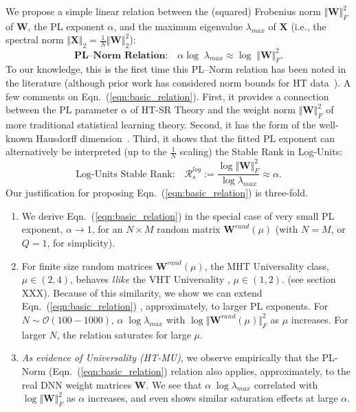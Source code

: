 We propose a simple linear relation between the (squared) Frobenius norm $\Vert\mathbf{W}\Vert^{2}_{F}$ of $\mathbf{W}$, the PL exponent $\alpha$, and the maximum eigenvalue $\lambda_{max}$ of $\mathbf{X}$ (i.e., the spectral norm $\Vert\mathbf{X}\Vert_{2}=\frac{1}{N}\Vert\mathbf{W}\Vert^{2}_{2}$):  
\begin{equation}
\textbf{PL--Norm Relation:} \quad \alpha\log\;\lambda_{max}\approx\log\;\Vert\mathbf{W}\Vert^{2}_{F}  .
\label{eqn:basic_relation}
\end{equation}
To our knowledge, this is the first time this PL--Norm relation has been noted in the literature (although prior work has considered norm bounds for HT data~\cite{MN09_TR}).
A few comments on Eqn.~(\ref{eqn:basic_relation}).
First, it provides a connection between the PL parameter $\alpha$ of HT-SR Theory and the weight norm $\Vert\mathbf{W}\Vert^{2}_{F}$ of more traditional statistical learning theory.
Second, it has the form of the well-known Hausdorff dimension~\cite{Sch07}.
Third, it shows that the fitted PL exponent can alternatively be interpreted (up to the $\frac{1}{N}$ scaling)  the Stable Rank in Log-Units:
$$
\mbox{Log-Units Stable Rank:} 
\quad
\mathcal{R}^{log}_{s}:=\dfrac{\log\Vert\mathbf{W}\Vert^{2}_{F}}{\log\lambda_{max}}  \approx \alpha  .
$$
Our justification for proposing Eqn.~(\ref{eqn:basic_relation}) is three-fold.
\begin{enumerate}
\item
\label{enum:first}
We derive Eqn.~(\ref{eqn:basic_relation}) in the special case of very small PL exponent, $\alpha \rightarrow 1$, for an $N\times M$ random matrix $\mathbf{W}^{rand}(\mu)$ (with $N=M$, or $Q=1$, for simplicity).
\item
\label{enum:second}
For finite size random matrices $\mathbf{W}^{rand}(\mu)$, the MHT Universality class, $\mu\in(2,4)$,  behaves \emph{llike} the VHT Universality , $\mu\in(1,2)$.
(see section XXX). 
Because of this similarity, we show we can extend Eqn.~(\ref{eqn:basic_relation}) , approximately, to larger PL exponents.
For  $N\sim\mathcal{O}(100-1000)$, $\alpha\;\log\lambda_{max}$    with $\log\Vert\mathbf{W}^{rand}(\mu)\Vert^{2}_{F}$  as $\mu$ increases.
For larger $N$, the relation saturates for large $\mu$.  
\item
\label{enum:third}
\emph{As evidence of  Universality (HT-MU)}, we observe empirically that the PL-Norm (Eqn.~(\ref{eqn:basic_relation})  relation also 
applies, approximately, to the real DNN weight matrices $\mathbf{W}$. We see that $\alpha\;\log\lambda_{max}$ 
    correlated with $\log\Vert\mathbf{W}\Vert^{2}_{F}$  as $\alpha$  increases, and even shows similar saturation effects at large $\alpha$.
\end{enumerate}

